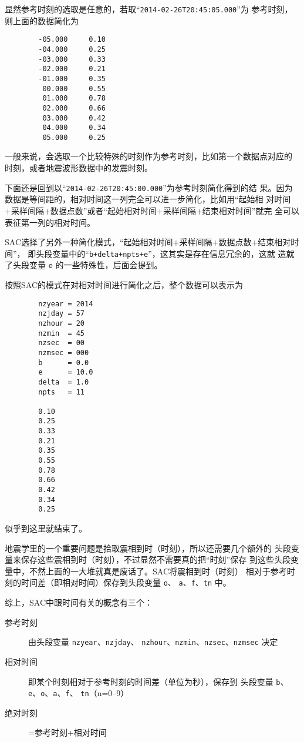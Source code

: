 显然参考时刻的选取是任意的，若取``\texttt{2014-02-26T20:45:05.000}''为
参考时刻，则上面的数据简化为
\begin{verbatim}
        -05.000     0.10
        -04.000     0.25
        -03.000     0.33
        -02.000     0.21
        -01.000     0.35
         00.000     0.55
         01.000     0.78
         02.000     0.66
         03.000     0.42
         04.000     0.34
         05.000     0.25
\end{verbatim}

一般来说，会选取一个比较特殊的时刻作为参考时刻，比如第一个数据点对应的
时刻，或者地震波形数据中的发震时刻。

下面还是回到以``\texttt{2014-02-26T20:45:00.000}''为参考时刻简化得到的结
果。因为数据是等间距的，相对时间这一列完全可以进一步简化，比如用``起始相
对时间+采样间隔+数据点数''或者``起始相对时间+采样间隔+结束相对时间''就完
全可以表征第一列的相对时间。

SAC选择了另外一种简化模式，``起始相对时间+采样间隔+数据点数+结束相对时间''，
即头段变量中的``\texttt{b+delta+npts+e}''，这其实是存在信息冗余的，这就
造就了头段变量 \texttt{e} 的一些特殊性，后面会提到。

按照SAC的模式在对相对时间进行简化之后，整个数据可以表示为
\begin{verbatim}
        nzyear = 2014
        nzjday = 57
        nzhour = 20
        nzmin  = 45
        nzsec  = 00
        nzmsec = 000
        b      = 0.0
        e      = 10.0
        delta  = 1.0
        npts   = 11

        0.10
        0.25
        0.33
        0.21
        0.35
        0.55
        0.78
        0.66
        0.42
        0.34
        0.25
\end{verbatim}
似乎到这里就结束了。

地震学里的一个重要问题是拾取震相到时（时刻），所以还需要几个额外的
头段变量来保存这些震相到时（时刻），不过显然不需要真的把``时刻''保存
到这些头段变量中，不然上面的一大堆就真是废话了。SAC将震相到时（时刻）
相对于参考时刻的时间差（即相对时间）保存到头段变量 \texttt{o}、
\texttt{a}、\texttt{f}、\texttt{tn} 中。

综上，SAC中跟时间有关的概念有三个：
\begin{description}
\item [参考时刻] 由头段变量 \texttt{nzyear}、\texttt{nzjday}、
    \texttt{nzhour}、\texttt{nzmin}、\texttt{nzsec}、\texttt{nzmsec} 决定
\item [相对时间] 即某个时刻相对于参考时刻的时间差（单位为秒），保存到
    头段变量 \texttt{b}、\texttt{e}、\texttt{o}、\texttt{a}、\texttt{f}、
    \texttt{tn}（n=0--9）
\item [绝对时刻] =参考时刻+相对时间
\end{description}

